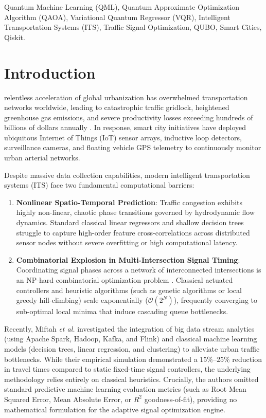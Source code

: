 \documentclass[journal,twoside]{IEEEtran}
\begin{document}
\begin{IEEEkeywords}
Quantum Machine Learning (QML), Quantum Approximate Optimization Algorithm (QAOA), Variational Quantum Regressor (VQR), Intelligent Transportation Systems (ITS), Traffic Signal Optimization, QUBO, Smart Cities, Qiskit.
\end{IEEEkeywords}

\section{Introduction}
 relentless acceleration of global urbanization has overwhelmed transportation networks worldwide, leading to catastrophic traffic gridlock, heightened greenhouse gas emissions, and severe productivity losses exceeding hundreds of billions of dollars annually \cite{greenshields1935study, daganzo1997fundamentals}. In response, smart city initiatives have deployed ubiquitous Internet of Things (IoT) sensor arrays, inductive loop detectors, surveillance cameras, and floating vehicle GPS telemetry to continuously monitor urban arterial networks.

Despite massive data collection capabilities, modern intelligent transportation systems (ITS) face two fundamental computational barriers:
\begin{enumerate}
    \item \textbf{Nonlinear Spatio-Temporal Prediction}: Traffic congestion exhibits highly non-linear, chaotic phase transitions governed by hydrodynamic flow dynamics. Standard classical linear regressors and shallow decision trees struggle to capture high-order feature cross-correlations across distributed sensor nodes without severe overfitting or high computational latency.
    \item \textbf{Combinatorial Explosion in Multi-Intersection Signal Timing}: Coordinating signal phases across a network of interconnected intersections is an NP-hard combinatorial optimization problem \cite{lucas2014ising}. Classical actuated controllers and heuristic algorithms (such as genetic algorithms or local greedy hill-climbing) scale exponentially ($\mathcal{O}(2^N)$), frequently converging to sub-optimal local minima that induce cascading queue bottlenecks.
\end{enumerate}

Recently, Miftah \textit{et al.} \cite{miftah2025big} investigated the integration of big data stream analytics (using Apache Spark, Hadoop, Kafka, and Flink) and classical machine learning models (decision trees, linear regression, and clustering) to alleviate urban traffic bottlenecks. While their empirical simulation demonstrated a $15\%\text{--}25\%$ reduction in travel times compared to static fixed-time signal controllers, the underlying methodology relies entirely on classical heuristics. Crucially, the authors omitted standard predictive machine learning evaluation metrics (such as Root Mean Squared Error, Mean Absolute Error, or $R^2$ goodness-of-fit), providing no mathematical formulation for the adaptive signal optimization engine.
\end{document}
